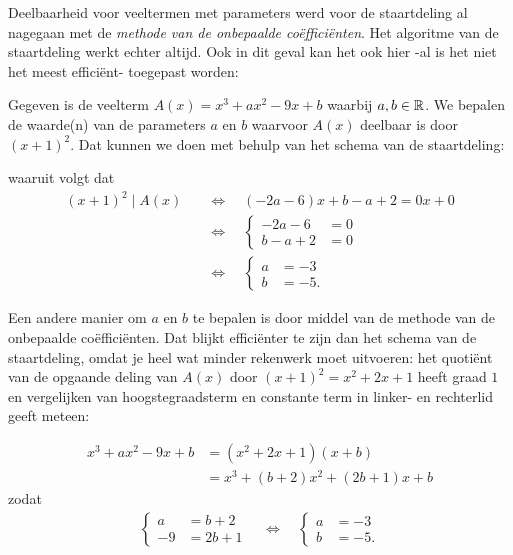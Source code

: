 \documentclass{ximera}
\begin{document}
Deelbaarheid voor veeltermen met parameters werd voor de staartdeling al nagegaan met de \textit{methode van de onbepaalde coëfficiënten}. Het algoritme van de staartdeling werkt echter altijd. Ook in dit geval kan het ook hier -al is het niet het meest efficiënt-  toegepast worden: 

\begin{example} 
Gegeven is de veelterm $A(x) = x^3 + ax^2 - 9x + b$ waarbij $a,b \in \mathbb{R}$. We bepalen de waarde(n) van de parameters $a$ en $b$ waarvoor $A(x)$ deelbaar is door $(x+1)^2$. Dat kunnen we doen met behulp van het schema van de staartdeling:

waaruit volgt dat  
\begin{align*}
(x+1)^2 \mid A(x) \quad 
& \Leftrightarrow \quad (-2a-6)x+b-a+2 = 0x + 0 \\
& \Leftrightarrow \quad
\left\{ 
\begin{aligned}
-2a-6 & = 0 \\
b-a+2 & = 0 
\end{aligned}
\right. \\ 
& \Leftrightarrow \quad
\left\{ 
\begin{aligned}
a & = -3 \\
b & = -5. 
\end{aligned}
\right.
\end{align*} 

Een andere manier om $a$ en $b$ te bepalen is door middel van de methode van de onbepaalde coëfficiënten. Dat blijkt efficiënter te zijn dan het schema van de staartdeling, omdat je heel wat minder rekenwerk moet uitvoeren: het quotiënt van de opgaande deling van $A(x)$ door $(x+1)^2 = x^2 + 2x + 1$ heeft graad $1$ en vergelijken van hoogstegraadsterm en constante term in linker- en rechterlid geeft meteen:

\begin{align*}
x^3 + ax^2 - 9x + b 
& = (x^2 + 2x + 1)(x + b) \\
& = x^3 + (b+2)x^2 + (2b+1)x + b
\end{align*}
zodat 
\begin{align*}
\left\{ 
\begin{aligned}
a & = b+2 \\
-9 & = 2b+1
\end{aligned}
\right. 
\quad \Leftrightarrow \quad
\left\{ 
\begin{aligned}
a & = -3 \\
b & = -5. 
\end{aligned}
\right.
\end{align*}
\end{example} 
	
	
\end{document}
